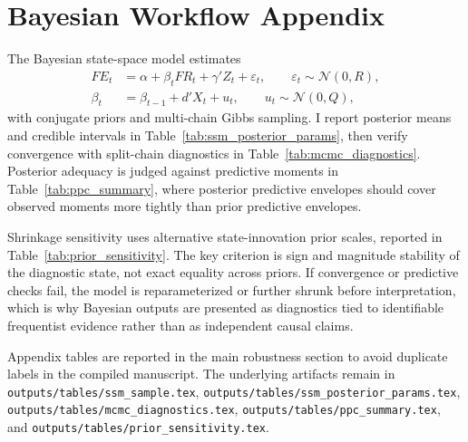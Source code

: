 \section{Bayesian Workflow Appendix}

The Bayesian state-space model estimates
\begin{align}
FE_t &= \alpha + \beta_t FR_t + \gamma'Z_t + \varepsilon_t, \qquad \varepsilon_t \sim \mathcal{N}(0, R), \\
\beta_t &= \beta_{t-1} + d'X_t + u_t, \qquad u_t \sim \mathcal{N}(0, Q),
\end{align}
with conjugate priors and multi-chain Gibbs sampling. I report posterior means and credible intervals in Table~\ref{tab:ssm_posterior_params}, then verify convergence with split-chain diagnostics in Table~\ref{tab:mcmc_diagnostics}. Posterior adequacy is judged against predictive moments in Table~\ref{tab:ppc_summary}, where posterior predictive envelopes should cover observed moments more tightly than prior predictive envelopes.

Shrinkage sensitivity uses alternative state-innovation prior scales, reported in Table~\ref{tab:prior_sensitivity}. The key criterion is sign and magnitude stability of the diagnostic state, not exact equality across priors. If convergence or predictive checks fail, the model is reparameterized or further shrunk before interpretation, which is why Bayesian outputs are presented as diagnostics tied to identifiable frequentist evidence rather than as independent causal claims.

Appendix tables are reported in the main robustness section to avoid duplicate labels in the compiled manuscript. The underlying artifacts remain in \texttt{outputs/tables/ssm\_sample.tex}, \texttt{outputs/tables/ssm\_posterior\_params.tex}, \texttt{outputs/tables/mcmc\_diagnostics.tex}, \texttt{outputs/tables/ppc\_summary.tex}, and \texttt{outputs/tables/prior\_sensitivity.tex}.
